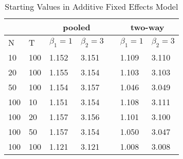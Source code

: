 \documentclass[a4paper]{article}
\begin{document}
\begin{table}[]
\caption{Starting Values in Additive Fixed Effects Model}
\label{table:table5}
\centering

\begin{threeparttable}

\begin{tabular}{lllllll}
                         &                          & \multicolumn{2}{c}{pooled}                                          &                                        & \multicolumn{2}{c}{two-way}                    \\ \hline
\multicolumn{1}{l|}{N}   & \multicolumn{1}{l|}{T}   & \multicolumn{1}{l|}{$\beta_1=1$} & \multicolumn{1}{l|}{$\beta_2=3$} & \multicolumn{1}{l|}{\multirow{8}{*}{}} & \multicolumn{1}{l|}{$\beta_1=1$} & $\beta_2=3$ \\ \cline{1-4} \cline{6-7}
\multicolumn{1}{l|}{10}  & \multicolumn{1}{l|}{100} & \multicolumn{1}{l|}{1.152}       & \multicolumn{1}{l|}{3.151}       & \multicolumn{1}{l|}{}                  & \multicolumn{1}{l|}{1.109}       & 3.110        \\ \cline{1-4} \cline{6-7}
\multicolumn{1}{l|}{20}  & \multicolumn{1}{l|}{100} & \multicolumn{1}{l|}{1.155}       & \multicolumn{1}{l|}{3.154}       & \multicolumn{1}{l|}{}                  & \multicolumn{1}{l|}{1.103}       & 3.103       \\ \cline{1-4} \cline{6-7}
\multicolumn{1}{l|}{50}  & \multicolumn{1}{l|}{100} & \multicolumn{1}{l|}{1.154}       & \multicolumn{1}{l|}{3.157}       & \multicolumn{1}{l|}{}                  & \multicolumn{1}{l|}{1.046}       & 3.049       \\ \cline{1-4} \cline{6-7}
\multicolumn{1}{l|}{100} & \multicolumn{1}{l|}{10}  & \multicolumn{1}{l|}{1.151}       & \multicolumn{1}{l|}{3.154}       & \multicolumn{1}{l|}{}                  & \multicolumn{1}{l|}{1.108}       & 3.111       \\ \cline{1-4} \cline{6-7}
\multicolumn{1}{l|}{100} & \multicolumn{1}{l|}{20}  & \multicolumn{1}{l|}{1.157}       & \multicolumn{1}{l|}{3.156}       & \multicolumn{1}{l|}{}                  & \multicolumn{1}{l|}{1.101}       & 3.100         \\ \cline{1-4} \cline{6-7}
\multicolumn{1}{l|}{100} & \multicolumn{1}{l|}{50}  & \multicolumn{1}{l|}{1.157}       & \multicolumn{1}{l|}{3.154}       & \multicolumn{1}{l|}{}                  & \multicolumn{1}{l|}{1.050}        & 3.047       \\ \cline{1-4} \cline{6-7}
\multicolumn{1}{l|}{100} & \multicolumn{1}{l|}{100} & \multicolumn{1}{l|}{1.121}       & \multicolumn{1}{l|}{3.121}       & \multicolumn{1}{l|}{}                  & \multicolumn{1}{l|}{1.008}       & 3.008       \\ \hline
\end{tabular}


\end{threeparttable}
\end{table}
\end{document}
